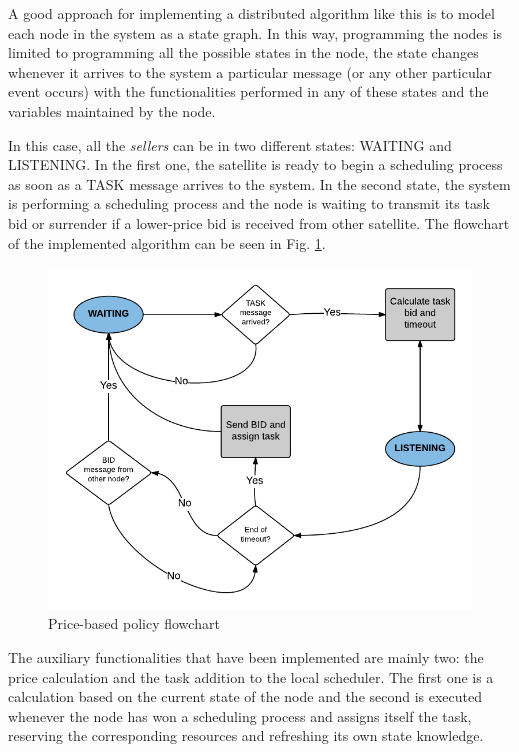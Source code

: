 A good approach for implementing a distributed algorithm like this is to model each node in the system as a state graph. In this way, programming the nodes is limited to programming all the possible states in the node, the state changes whenever it arrives to the system a particular message (or any other particular event occurs) with the functionalities performed in any of these states and the variables maintained by the node.

In this case, all the \emph{sellers} can be in two different states: WAITING and LISTENING. In the first one, the satellite is ready to begin a scheduling process as soon as a TASK message arrives to the system. In the second state, the system is performing a scheduling process and the node is waiting to transmit its task bid or surrender if a lower-price bid is received from other satellite. The flowchart of the implemented algorithm can be seen in Fig. \ref{fig_state_graph}.

\begin{figure}[h!]
\centering
\includegraphics[scale=0.7]{Figures/flow_mb.png} 
\caption{Price-based policy flowchart}
\label{fig_state_graph}
\end{figure}

The auxiliary functionalities that have been implemented are mainly two: the price calculation and the task addition to the local scheduler. The first one is a calculation based on the current state of the node and the second is executed whenever the node has won a scheduling process and assigns itself the task, reserving the corresponding resources and refreshing its own state knowledge.

